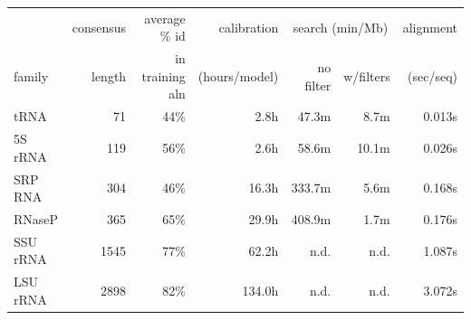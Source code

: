 \documentclass[11pt]{article}
\begin{document}
\newpage

\begin{table}
\begin{center}
\begin{tabular}{lrr|r|rr|r|} 
       & consensus & average \% id   & calibration  & \multicolumn{2}{c|}{search (min/Mb)} & alignment \\
family & length    & in training aln & (hours/model)& no filter & w/filters & (sec/seq) \\ \hline
tRNA    & 71       & 44\%            &       2.8h   &     47.3m &       8.7m&  0.013s \\
5S rRNA & 119      & 56\%            &       2.6h   &     58.6m &      10.1m&  0.026s \\
SRP RNA & 304      & 46\%            &      16.3h   &    333.7m &       5.6m&  0.168s \\
RNaseP  & 365      & 65\%            &      29.9h   &    408.9m &       1.7m&  0.176s \\
SSU rRNA& 1545     & 77\%            &      62.2h   &      n.d. &       n.d.&  1.087s \\
LSU rRNA& 2898     & 82\%            &     134.0h   &      n.d. &       n.d.&  3.072s \\
\end{tabular}
%
% 
% 
%
%
%
% 
% 

\end{center}
\end{table}
\end{document}
